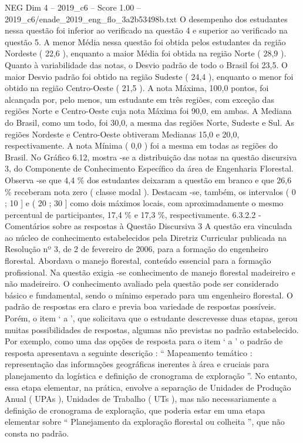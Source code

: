 \begin{textsample}{NEG Dim 4 – 2019\_c6 – Score 1.00 – 2019\_c6/enade\_2019\_eng\_flo\_3a2b53498b.txt}
O desempenho dos estudantes nessa questão foi inferior ao verificado na questão 4 e superior ao verificado na questão 5.
A menor Média nessa questão foi obtida pelos estudantes da região Nordeste ( 22,6 ), enquanto a maior Média foi obtida na região Norte ( 28,9 ).
Quanto à variabilidade das notas, o Desvio padrão de todo o Brasil foi 23,5.
O maior Desvio padrão foi obtido na região Sudeste ( 24,4 ), enquanto o menor foi obtido na região Centro-Oeste ( 21,5 ).
A nota Máxima, 100,0 pontos, foi alcançada por, pelo menos, um estudante em três regiões, com exceção das regiões Norte e Centro-Oeste cuja nota Máxima foi 90,0, em ambas.
A Mediana do Brasil, como um todo, foi 30,0, a mesma das regiões Norte, Sudeste e Sul.
As regiões Nordeste e Centro-Oeste obtiveram Medianas 15,0 e 20,0, respectivamente.
A nota Mínima ( 0,0 ) foi a mesma em todas as regiões do Brasil.
No Gráfico 6.12, mostra -se a distribuição das notas na questão discursiva 3, do Componente de Conhecimento Específico da área de Engenharia Florestal.
Observa -se que 4,4 \% dos estudantes deixaram a questão em branco e que 26,6 \% receberam nota zero ( classe modal ).
Destacam -se, também, os intervalos ( 0 ; 10 ] e ( 20 ; 30 ] como dois máximos locais, com aproximadamente o mesmo percentual de participantes, 17,4 \% e 17,3 \%, respectivamente. 6.3.2.2 - Comentários sobre as respostas à Questão Discursiva 3 A questão era vinculada ao núcleo de conhecimento estabelecidos pela Diretriz Curricular publicada na Resolução nº 3, de 2 de fevereiro de 2006, para a formação do engenheiro florestal.
Abordava o manejo florestal, conteúdo essencial para a formação profissional.
Na questão exigia -se conhecimento de manejo florestal madeireiro e não madeireiro.
O conhecimento avaliado pela questão pode ser considerado básico e fundamental, sendo o mínimo esperado para um engenheiro florestal.
O padrão de respostas era claro e previa boa variedade de respostas possíveis.
Porém, o item ‘ a ’, que solicitava que o estudante descrevesse duas etapas, gerou muitas possibilidades de respostas, algumas não previstas no padrão estabelecido.
Por exemplo, como uma das opções de resposta para o item ‘ a ’ o padrão de resposta apresentava a seguinte descrição : “ Mapeamento temático : representação das informações geográficas inerentes à área e cruciais para planejamento da logística e definição de cronograma de exploração ”.
No entanto, essa etapa elementar, na prática, envolve a separação de Unidades de Produção Anual ( UPAs ), Unidades de Trabalho ( UTs ), mas não necessariamente a definição de cronograma de exploração, que poderia estar em uma etapa elementar sobre “ Planejamento da exploração florestal ou colheita ”, que não consta no padrão.

\end{textsample}
